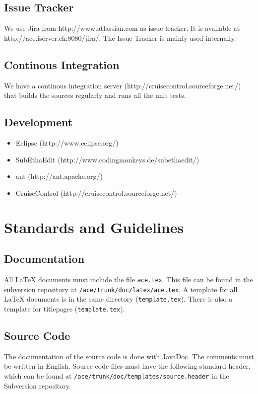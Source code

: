 \documentclass[11pt,a4paper]{article}
\begin{document}
\subsection{Issue Tracker}
We use Jira from http://www.atlassian.com as issue tracker. It is available
at http://ace.iserver.ch:8080/jira/. The Issue Tracker is mainly used internally.

\subsection{Continous Integration}
We have a continous integration server (http://cruisecontrol.sourceforge.net/) that builds the
sources regularly and runs all the unit tests.

\subsection{Development}
\begin{itemize}
 \item Eclipse (http://www.eclipse.org/)
 \item SubEthaEdit (http://www.codingmonkeys.de/subethaedit/)
 \item ant (http://ant.apache.org/)
 \item CruiseControl (http://cruisecontrol.sourceforge.net/)
\end{itemize}


\section{Standards and Guidelines}

\subsection{Documentation}
All \LaTeX{} documents must include the file \texttt{ace.tex}. This file can be found in the subversion repository at \texttt{/ace/trunk/doc/latex/ace.tex}.
A template for all \LaTeX{} documents is in the same directory (\texttt{template.tex}). There is also a template for titlepages (\texttt{template.tex}).

\subsection{Source Code}
The documentation of the source code is done with JavaDoc. The comments must be written in English. Source code files must have the following standard header,
which can be found at \texttt{/ace/trunk/doc/templates/source.header} in the Subversion repository.
\end{document}
